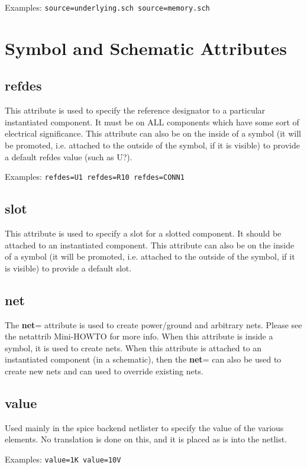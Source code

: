 \documentclass{article}
\begin{document}
Examples: \texttt{source=underlying.sch source=memory.sch}


\section{Symbol and Schematic Attributes}

\subsection{{\bf refdes}\label{refdes}}
This attribute is used to specify the reference designator to a particular
instantiated component.  It must be on ALL components which have some
sort of electrical significance.  This attribute can also be on the
inside of a symbol (it will be promoted, i.e. attached to the outside of
the symbol, if it is visible) to provide a default refdes value (such as
U?).

Examples: \texttt{refdes=U1 refdes=R10 refdes=CONN1}

\subsection{{\bf slot}\label{slot}}
This attribute is used to specify a slot for a slotted component.
It should be attached to an instantiated component.  This attribute can
also be on the inside of a symbol (it will be promoted, i.e. attached
to the outside of the symbol, if it is visible) to provide a default
slot.

\subsection{{\bf net}\label{net}}
The {\bf net}= attribute is used to create power/ground and arbitrary nets.
Please see the netattrib Mini-HOWTO for more info.  When this attribute
is inside a symbol, it is used to create nets.  When this attribute is
attached to an instantiated component (in a schematic), then the
{\bf net}= can also be used to create new nets and can used to override
existing nets.

\subsection{{\bf value}\label{value}}
Used mainly in the spice backend netlister to specify the value of the
various elements.  No translation is done on this, and it is placed as
is into the netlist.

Examples: \texttt{value=1K value=10V}
\end{document}
